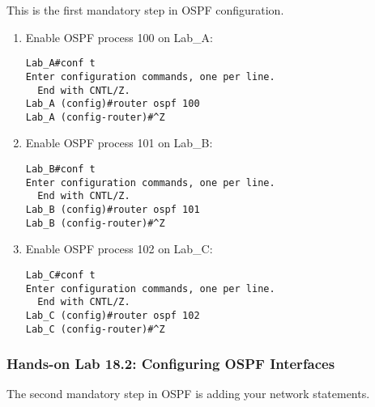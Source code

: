 This is the first mandatory step in OSPF configuration.

\begin{enumerate}
\item
  Enable OSPF process 100 on Lab\_A:

\begin{verbatim}
Lab_A#conf t
Enter configuration commands, one per line.
  End with CNTL/Z.
Lab_A (config)#router ospf 100
Lab_A (config-router)#^Z
\end{verbatim}
\item
  Enable OSPF process 101 on Lab\_B:

\begin{verbatim}
Lab_B#conf t
Enter configuration commands, one per line.
  End with CNTL/Z.
Lab_B (config)#router ospf 101
Lab_B (config-router)#^Z
\end{verbatim}
\item
  Enable OSPF process 102 on Lab\_C:

\begin{verbatim}
Lab_C#conf t
Enter configuration commands, one per line.
  End with CNTL/Z.
Lab_C (config)#router ospf 102
Lab_C (config-router)#^Z
\end{verbatim}
\end{enumerate}

\subsubsection[Hands-on Lab 18.2: Configuring OSPF
Interfaces]{\texorpdfstring{\protect\hypertarget{c18.xhtmlux5cux23c18-sec-22}{}{}Hands-on
Lab 18.2: Configuring OSPF
Interfaces}{Hands-on Lab 18.2: Configuring OSPF Interfaces}}

The second mandatory step in OSPF is adding your network statements.

